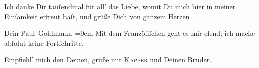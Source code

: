 \pstart
           Ich danke Dir tauſendmal für all’ das Liebe, womit Du mich hier in meiner Einſamkeit
               erfreut haſt, und grüße Dich von ganzem Herzen\pend
           
\pstart
           Dein \damage{\textcolor{gray}{treuer}}{\\[\baselineskip]}\spacefill\mbox{Paul Goldmann.}\pend
           \leftskip=0em{}
\pstart
           \noindent{}Mit dem Franzöſiſchen geht es mir elend; ich mache abſolut keine Fortſchritte.\pend
           
\pstart
           Empfiehl’ mich den Deinen, grüße mir \textsc{Kapper} und Deinen Bruder.\pend
           \endnumbering{}  \newcommand{\dateiname}{L02668}\newcommand{\titel}{Paul Goldmann an Arthur Schnitzler, 4. 8. 1891}\newcommand{\editorInnen}{Martin Anton Müller und Laura Untner}
